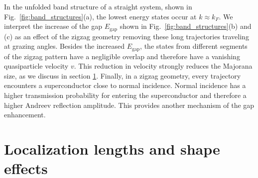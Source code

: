In the unfolded band structure of a straight system, shown in Fig.~\ref{fig:band_structures}(a), the lowest energy states occur at $k \approx k_F$.
We interpret the increase of the gap $E_\textrm{gap}$ shown in Fig.~\ref{fig:band_structures}(b) and (c) as an effect of the zigzag geometry removing these long trajectories traveling at grazing angles.
Besides the increased $E_\textrm{gap}$, the states from different segments of the zigzag pattern have a negligible overlap and therefore have a vanishing quasiparticle velocity $v$.
This reduction in velocity strongly reduces the Majorana size, as we discuss in section \ref{sec:shape_effects}.
Finally, in a zigzag geometry, every trajectory encounters a superconductor close to normal incidence.
Normal incidence has a higher transmission probability for entering the superconductor and therefore a higher Andreev reflection amplitude.
This provides another mechanism of the gap enhancement.


\section{Localization lengths and shape effects}\label{sec:shape_effects}

